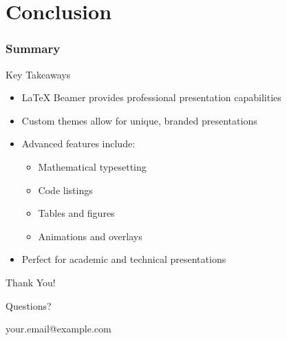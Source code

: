 \documentclass{beamer}
\begin{document}
\section{Conclusion}

\begin{frame}
  \frametitle{Summary}
  
  \begin{block}{Key Takeaways}
    \begin{itemize}
      \item \LaTeX{} Beamer provides professional presentation capabilities
      \item Custom themes allow for unique, branded presentations
      \item Advanced features include:
        \begin{itemize}
          \item Mathematical typesetting
          \item Code listings
          \item Tables and figures
          \item Animations and overlays
        \end{itemize}
      \item Perfect for academic and technical presentations
    \end{itemize}
  \end{block}
\end{frame}

\begin{frame}[plain]
  \centering
  \vspace{2cm}
  {\huge Thank You!}
  
  \vspace{1cm}
  {\Large Questions?}
  
  \vspace{2cm}
  {\ttfamily your.email@example.com}
\end{frame}
\end{document}

